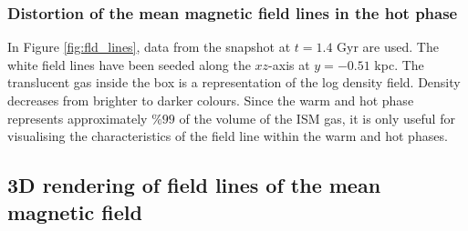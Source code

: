 \documentclass[useAMS,usenatbib]{mn2e}
\begin{document}
\subsubsection{Distortion of the mean magnetic field lines in the hot phase}
In Figure \ref{fig:fld_lines}, data from the snapshot at $t=1.4$ Gyr are used. The white field lines have been seeded along the $xz$-axis at $y=-0.51$ kpc. The translucent gas inside the box is a representation of the log density field. Density decreases from brighter to darker colours. Since the warm and hot phase represents approximately $\%99$ of the volume of the ISM gas, it is only useful for visualising the characteristics of the field line within the warm and hot phases. 

\subsection{3D rendering of field lines of the mean magnetic field}
\end{document}
